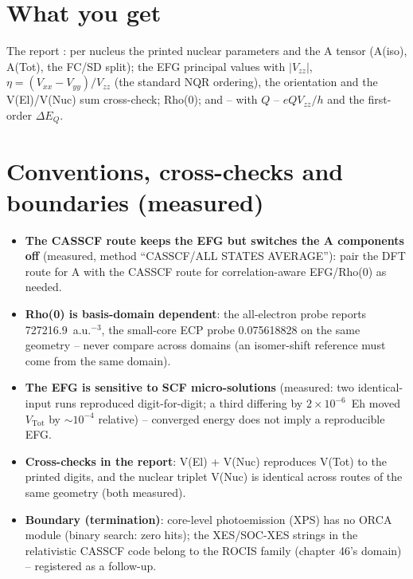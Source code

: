\section{What you get}

The report : per nucleus the printed
nuclear parameters and the A tensor (A(iso), A(Tot), the FC/SD split);
the EFG principal values with $|V_{zz}|$, $\eta = (V_{xx}-V_{yy})/V_{zz}$
(the standard NQR ordering), the orientation and the V(El)/V(Nuc) sum
cross-check; Rho(0); and -- with $Q$ -- $eQV_{zz}/h$ and the
first-order $\Delta E_Q$.

\section{Conventions, cross-checks and boundaries (measured)}

\begin{readbox}
\begin{itemize}
  \item \textbf{The CASSCF route keeps the EFG but switches the A
    components off} (measured, method ``CASSCF/ALL STATES AVERAGE''):
    pair the DFT route for A with the CASSCF route for correlation-aware
    EFG/Rho(0) as needed.
  \item \textbf{Rho(0) is basis-domain dependent}: the all-electron probe
    reports 727216.9~a.u.$^{-3}$, the small-core ECP probe 0.075618828 on
    the same geometry -- never compare across domains (an isomer-shift
    reference must come from the same domain).
  \item \textbf{The EFG is sensitive to SCF micro-solutions} (measured:
    two identical-input runs reproduced digit-for-digit; a third differing
    by $2\times10^{-6}$~Eh moved $V_{\mathrm{Tot}}$ by $\sim10^{-4}$ relative)
    -- converged energy does not imply a reproducible EFG.
  \item \textbf{Cross-checks in the report}: V(El) + V(Nuc) reproduces
    V(Tot) to the printed digits, and the nuclear triplet V(Nuc) is
    identical across routes of the same geometry (both measured).
  \item \textbf{Boundary (termination)}: core-level photoemission (XPS)
    has no ORCA module (binary search: zero hits); the XES/SOC-XES strings
    in the relativistic CASSCF code belong to the ROCIS family (chapter
    46's domain) -- registered as a follow-up.
\end{itemize}
\end{readbox}
